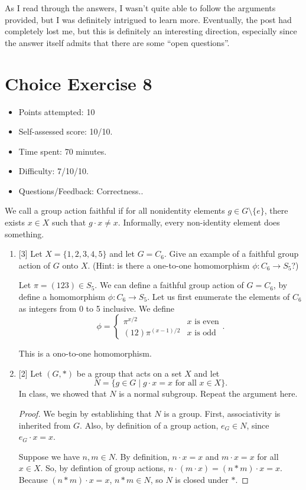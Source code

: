 \documentclass{article}
\newcommand{\reflection}[5]{
    \begin{itemize}
    \item Points attempted: #1
    \item Self-assessed score: #2/#1.
    \item Time spent: #3 minutes.
    \item Difficulty: #4/10.
    \item Questions/Feedback: #5.
    \end{itemize}
}
\begin{document}
As I read through the answers, I wasn't quite able to follow the arguments provided,
but I was definitely intrigued to learn more. Eventually, the post had completely 
lost me, but this is definitely an interesting direction, especially since the 
answer itself admits that there are some ``open questions''.
\pagebreak

\section*{Choice Exercise 8}
\reflection{10}{10}{70}{7/10}{Correctness.}
We call a group action faithful if for all nonidentity elements \( g \in G \setminus \{e\} \), there exists \( x \in X \) such that \( g \cdot x \neq x \). Informally, every non-identity element does something.
\begin{enumerate}
    \item {
        [3] Let \(X = \{1, 2, 3, 4, 5\}\) and let \(G = C_6\). Give an example of a faithful group action of \(G\) onto \(X\). (Hint: is there a one-to-one homomorphism \(\phi\colon C_6 \to S_5\)?)

        Let \(\pi = (123) \in S_5\). We can define a faithful group action of
        \(G = C_6\), by define a homomorphism \(\phi \colon C_6 \to S_5\). Let
        us first enumerate the elements of \(C_6\) as integers from 0 to 5 inclusive.
        We define
        \[
        \phi = \begin{cases}
            \pi^{x/2} &x \text{ is even} \\
            (12) \pi^{(x-1)/2} &x \text{ is odd}
        \end{cases}.
        \]

        This is a ono-to-one homomorphism.
    }

    \item {
        [2] Let \( (G, *) \) be a group that acts on a set \( X \) and let \[         N = \{ g \in G \mid g \cdot x = x \text{ for all } x \in X \}.       \] In class, we showed that \( N \) is a normal subgroup. Repeat the argument here.

        \begin{proof}
            We begin by establishing that \(N\) is a group. First, associativity
            is inherited from \(G\).  Also, by definition of a group action, 
            \(e_G \in N\), since \(e_G \cdot x = x\).
            
            Suppose we have \(n, m \in N\). By definition,
            \(n \cdot x = x\) and \(m \cdot x = x\) for all \(x \in X\). So, 
            by defintion of group actions, \(n \cdot (m \cdot x) = (n * m) \cdot x = x\).
            Because \((n * m) \cdot x = x\), \(n*m \in N\), so \(N\) is closed under \(*\).


\end{proof}}
\end{enumerate}
\end{document}
